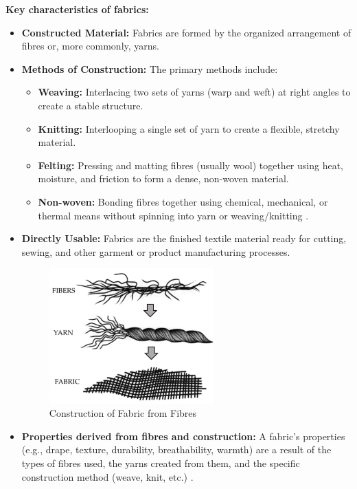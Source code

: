 \textbf{Key characteristics of fabrics:}
\begin{itemize}
    \item \textbf{Constructed Material:} Fabrics are formed by the organized arrangement of fibres or, more commonly, yarns.
    \item \textbf{Methods of Construction:} The primary methods include:
        \begin{itemize}
            \item \textbf{Weaving:} Interlacing two sets of yarns (warp and weft) at right angles to create a stable structure.
            \item \textbf{Knitting:} Interlooping a single set of yarn to create a flexible, stretchy material.
            \item \textbf{Felting:} Pressing and matting fibres (usually wool) together using heat, moisture, and friction to form a dense, non-woven material.
            \item \textbf{Non-woven:} Bonding fibres together using chemical, mechanical, or thermal means without spinning into yarn or weaving/knitting \cite{hong2024research}.
        \end{itemize}
        \item \textbf{Directly Usable:} Fabrics are the finished textile material ready for cutting, sewing, and other garment or product manufacturing processes.
        \begin{figure}[H]
            \centering
            \includegraphics[width=0.6\textwidth]{images/fabric_construction}
            \caption{Construction of Fabric from Fibres}
            \label{fig:fabric_construction}
        \end{figure}
    \item \textbf{Properties derived from fibres and construction:} A fabric's properties (e.g., drape, texture, durability, breathability, warmth) are a result of the types of fibres used, the yarns created from them, and the specific construction method (weave, knit, etc.) \cite{researchgate, hong2024research}.
\end{itemize}

